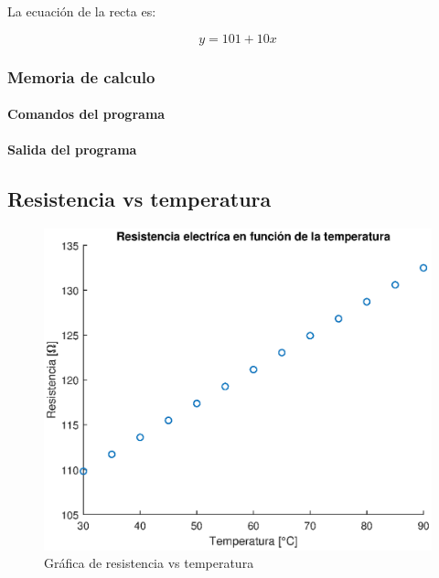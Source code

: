 \documentclass[letter,11pt]{article}
\begin{document}
La ecuación de la recta es:

\begin{equation}
    y = 101 + 10 x
\end{equation}

\subsubsection{Memoria de calculo}

\paragraph{Comandos del programa}
\begin{alltt}
\footnotesize

\normalsize
\end{alltt}

\paragraph{Salida del programa}
\begin{alltt}
\footnotesize

\normalsize
\end{alltt}

\subsection{Resistencia vs temperatura}
\begin{figure}[!h]
\centering
\includegraphics[scale=1.00]{eps/3.3.1.eps}
\caption{Gráfica de resistencia vs temperatura}
\label{practica33}
\end{figure}
\end{document}
